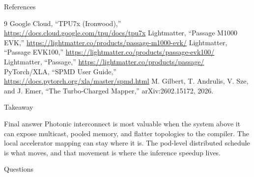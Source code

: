 \documentclass[10pt,aspectratio=169]{beamer}
\begin{document}
\begin{frame}{References}
  \scriptsize
  \begin{thebibliography}{9}
   Google Cloud, ``TPU7x (Ironwood),'' \url{https://docs.cloud.google.com/tpu/docs/tpu7x}
   Lightmatter, ``Passage M1000 EVK,'' \url{https://lightmatter.co/products/passage-m1000-evk/}
   Lightmatter, ``Passage EVK100,'' \url{https://lightmatter.co/products/passage-evk100/}
   Lightmatter, ``Passage,'' \url{https://lightmatter.co/products/passage/}
   PyTorch/XLA, ``SPMD User Guide,'' \url{https://docs.pytorch.org/xla/master/spmd.html}
   M. Gilbert, T. Andrulis, V. Sze, and J. Emer, ``The Turbo-Charged Mapper,'' arXiv:2602.15172, 2026.
  \end{thebibliography}
\end{frame}

\begin{frame}{Takeaway}
  \begin{block}{Final answer}
  Photonic interconnect is most valuable when the system above it can expose multicast, pooled memory, and flatter topologies to the compiler. The local accelerator mapping can stay where it is. The pod-level distributed schedule is what moves, and that movement is where the inference speedup lives.
  \end{block}
  \vspace{0.5em}
  \begin{center}
    {\Large Questions}
  \end{center}
\end{frame}
\end{document}
